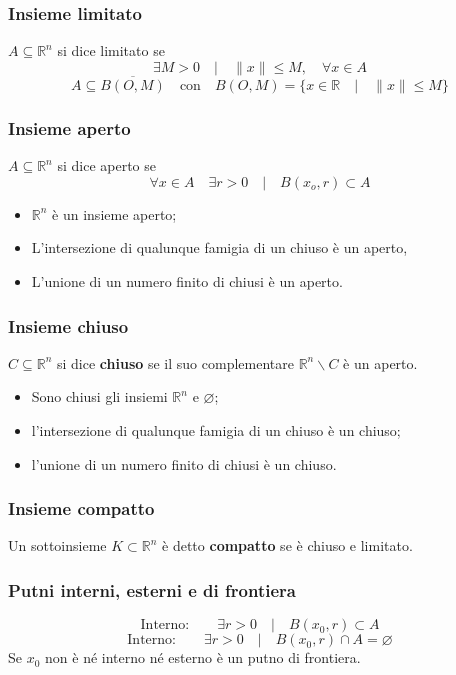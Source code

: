 \documentclass[x11names]{article}
\begin{document}
\subsubsection*{Insieme limitato}
\(A \subseteq \mathbb{R}^n\) si dice limitato se
\[ 
\exists M > 0 \quad | \quad \|x\| \leq M, \quad \forall x \in A
\]
\[ 
A \subseteq \overline{B(O,M)} \quad \text{con} \quad B(O,M) = \{x \in \mathbb{R} \quad | \quad \|x\|\leq M \}
\]
\subsubsection*{Insieme aperto}
\(A\subseteq \mathbb{R}^n\) si dice aperto se 
\[ 
\forall x \in A \quad \exists r > 0 \quad | \quad B(x_{o},r) \subset A
\]
\begin{itemize}
	\item	\(\mathbb{R}^n\) è un insieme aperto;
	\item   L'intersezione di qualunque famigia di un chiuso è un aperto,
	\item   L'unione di un numero finito di chiusi è un aperto.
\end{itemize}

\subsubsection*{Insieme chiuso}
\(C\subseteq \mathbb{R}^n\) si dice \textbf{chiuso} se il suo complementare \(\mathbb{R}^n \backslash C\) è un aperto.

\begin{itemize}
	\item	Sono chiusi gli insiemi \(\mathbb{R}^n\) e \(\varnothing\);
	\item  l'intersezione di qualunque famigia di un chiuso è un chiuso;
	\item   l'unione di un numero finito di chiusi è un chiuso.
\end{itemize}


\subsubsection*{Insieme compatto}
Un sottoinsieme \(K\subset \mathbb{R}^n\) è detto \textbf{compatto} se è chiuso e limitato.

\subsubsection*{Putni interni, esterni e di frontiera}
\[ 
\text{Interno:} \qquad \exists r > 0 \quad | \quad B(x_{0}, r) \subset A
\]
\[ 
\text{Interno:} \qquad \exists r > 0 \quad | \quad B(x_{0}, r) \cap A = \varnothing
\]
Se \(x_{0}\) non è né interno né esterno è un putno di frontiera.
\end{document}
